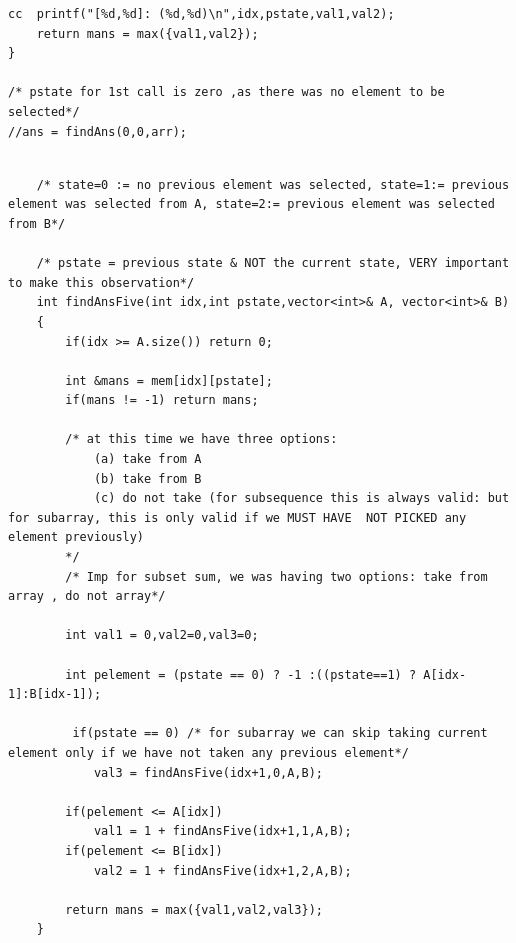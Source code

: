 \begin{solution}
\begin{minipage}{\textwidth}
\begin{lstlisting}
cc  printf("[%d,%d]: (%d,%d)\n",idx,pstate,val1,val2);
    return mans = max({val1,val2});
}

/* pstate for 1st call is zero ,as there was no element to be selected*/
//ans = findAns(0,0,arr); 

\end{lstlisting}
\end{minipage}



\begin{minipage}{\textwidth}
\begin{lstlisting}

    /* state=0 := no previous element was selected, state=1:= previous element was selected from A, state=2:= previous element was selected from B*/

    /* pstate = previous state & NOT the current state, VERY important to make this observation*/
    int findAnsFive(int idx,int pstate,vector<int>& A, vector<int>& B) 
    {
        if(idx >= A.size()) return 0;
        
        int &mans = mem[idx][pstate];
        if(mans != -1) return mans;
        
        /* at this time we have three options:
            (a) take from A
            (b) take from B
            (c) do not take (for subsequence this is always valid: but for subarray, this is only valid if we MUST HAVE  NOT PICKED any element previously)
        */
        /* Imp for subset sum, we was having two options: take from array , do not array*/
        
        int val1 = 0,val2=0,val3=0;
        
        int pelement = (pstate == 0) ? -1 :((pstate==1) ? A[idx-1]:B[idx-1]);
        
         if(pstate == 0) /* for subarray we can skip taking current element only if we have not taken any previous element*/
            val3 = findAnsFive(idx+1,0,A,B);
        
        if(pelement <= A[idx])
            val1 = 1 + findAnsFive(idx+1,1,A,B);
        if(pelement <= B[idx])
            val2 = 1 + findAnsFive(idx+1,2,A,B);
        
        return mans = max({val1,val2,val3});
    }
\end{lstlisting}
\end{minipage}
\end{solution}

